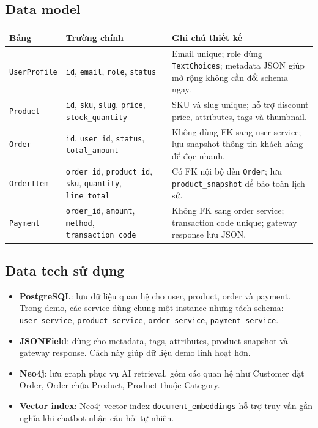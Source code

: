 \documentclass[12pt,a4paper]{report}
\begin{document}
\subsection{Data model}
\begin{longtable}{p{3cm}p{4.3cm}p{6.3cm}}
\toprule
\textbf{Bảng} & \textbf{Trường chính} & \textbf{Ghi chú thiết kế} \\
\midrule
\texttt{UserProfile} & \texttt{id}, \texttt{email}, \texttt{role}, \texttt{status} & Email unique; role dùng \texttt{TextChoices}; metadata JSON giúp mở rộng không cần đổi schema ngay. \\
\texttt{Product} & \texttt{id}, \texttt{sku}, \texttt{slug}, \texttt{price}, \texttt{stock\_quantity} & SKU và slug unique; hỗ trợ discount price, attributes, tags và thumbnail. \\
\texttt{Order} & \texttt{id}, \texttt{user\_id}, \texttt{status}, \texttt{total\_amount} & Không dùng FK sang user service; lưu snapshot thông tin khách hàng để đọc nhanh. \\
\texttt{OrderItem} & \texttt{order\_id}, \texttt{product\_id}, \texttt{sku}, \texttt{quantity}, \texttt{line\_total} & Có FK nội bộ đến \texttt{Order}; lưu \texttt{product\_snapshot} để bảo toàn lịch sử. \\
\texttt{Payment} & \texttt{order\_id}, \texttt{amount}, \texttt{method}, \texttt{transaction\_code} & Không FK sang order service; transaction code unique; gateway response lưu JSON. \\
\bottomrule
\end{longtable}

\subsection{Data tech sử dụng}
\begin{itemize}
  \item \textbf{PostgreSQL}: lưu dữ liệu quan hệ cho user, product, order và payment. Trong demo, các service dùng chung một instance nhưng tách schema: \texttt{user\_service}, \texttt{product\_service}, \texttt{order\_service}, \texttt{payment\_service}.
  \item \textbf{JSONField}: dùng cho metadata, tags, attributes, product snapshot và gateway response. Cách này giúp dữ liệu demo linh hoạt hơn.
  \item \textbf{Neo4j}: lưu graph phục vụ AI retrieval, gồm các quan hệ như Customer đặt Order, Order chứa Product, Product thuộc Category.
  \item \textbf{Vector index}: Neo4j vector index \texttt{document\_embeddings} hỗ trợ truy vấn gần nghĩa khi chatbot nhận câu hỏi tự nhiên.
\end{itemize}
\end{document}
